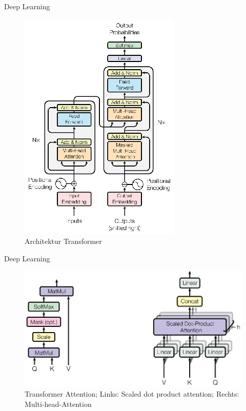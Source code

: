 \documentclass[aspectratio=169]{beamer} %
\begin{document}
\begin{frame}{Deep Learning}
    \begin{center}
        \begin{figure}
            \includegraphics[scale=1.2]{figures/TransformerArchitektur.eps}
            \caption{Architektur Transformer}
        \end{figure}
    \end{center}
\end{frame}


\begin{frame}{Deep Learning}
    \begin{center}
        \begin{figure}
            \includegraphics[scale=0.9]{figures/TransformerAttention.eps}
            \caption{Transformer Attention; Links: Scaled dot product attention; Rechts: Multi-head-Attention}
        \end{figure}
    \end{center}
\end{frame}
\end{document}
